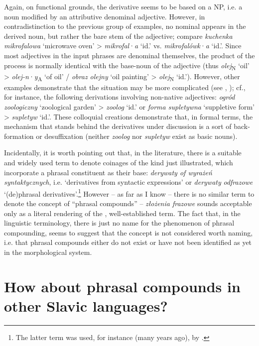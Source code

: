 \documentclass[output=paper]{LSP/langsci}
\begin{document}
{Again, on functional grounds, the derivative seems to be based on a NP, i.e. a noun modified by an attributive denominal adjective. However, in contradistinction to the previous group of examples, no nominal  appears in the derived noun, but rather the bare stem of the adjective; compare} {\textit{kuchenka mikrofalowa}} {‘microwave oven’ >} {\textit{mikrofal}}·{\textit{a}} {‘id.’ vs.} {\textit{mikrofalówk}}·{\textit{a}} {‘id.’. Since most adjectives in the input phrases are denominal themselves, the product of the process is normally identical with the base-noun of the adjective (thus} {\textit{olej}}{\textsubscript{N}} {‘oil’ >} {\textit{olej-n}}·{\textit{y}}{\textsubscript{A}} {‘of oil’ /} {\textit{obraz olejny}} {‘oil painting’ >} {\textit{olej}}{\textsubscript{N}} {‘id.’). However, other examples demonstrate that the situation may be more complicated (see \citealt{Chludzińska-Świątecka1979}, \citealt[137]{Jadacka2001}); cf., for instance, the following derivations involving non-native adjectives:} {\textit{ogród zoologiczny}} {‘zoological garden’ >} {\textit{zoolog}} {‘id.’ or} {\textit{forma supletywna}} {‘suppletive form’ >} {\textit{supletyw}} {‘id.’. These colloquial creations demonstrate that, in formal terms, the mechanism that stands behind the derivatives under discussion is a sort of back-formation or desuffixation (neither} {\textit{zoolog}} {nor} {\textit{supletyw}} {exist as basic nouns).}

{Incidentally, it is worth pointing out that, in the  literature, there is a suitable and widely used term to denote coinages of the kind just illustrated, which incorporate a phrasal constituent as their base:} {\textit{derywaty of wyrażeń syntaktycznych}}{, i.e. ‘derivatives from syntactic expressions’ or} {\textit{derywaty}} {\textit{odfrazowe}} {‘(de)phrasal derivatives’.}\footnote{{The latter term was used, for instance (many years ago), by \citet{Kreja1971}.}} {However – as far as I know – there is no similar  term to denote the concept of “phrasal compounds” –} {\textit{złożenia frazowe}} {sounds acceptable only as a literal rendering of the , well-established term. The fact that, in the  linguistic terminology, there is just no name for the phenomenon of phrasal compounding, seems to suggest that the concept is not considered worth naming, i.e. that phrasal compounds either do not exist or have not been identified as yet in the  morphological system.}

\section{How about phrasal compounds in other Slavic languages?}\label{sec:szymanek:5}
\end{document}
